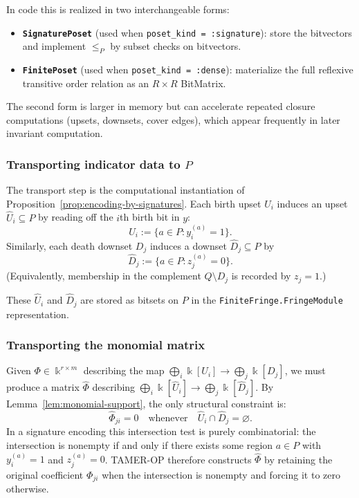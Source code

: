 \documentclass{article}
\newcommand{\kk}{\Bbbk}
\newcommand{\<}{\langle}
\renewcommand{\>}{\rangle}
\theoremstyle{definition}
\theoremstyle{remark}
\begin{document}
	In code this is realized in two interchangeable forms:
	\begin{itemize}
		\item \textbf{\texttt{SignaturePoset}} (used when \texttt{poset\_kind = :signature}):
		store the bitvectors and implement $\le_P$ by subset checks on bitvectors.
		\item \textbf{\texttt{FinitePoset}} (used when \texttt{poset\_kind = :dense}):
		materialize the full reflexive transitive order relation as an $R\times R$ BitMatrix.
	\end{itemize}
	The second form is larger in memory but can accelerate repeated closure computations
	(upsets, downsets, cover edges), which appear frequently in later invariant
	computation.
	
	\subsubsection*{Transporting indicator data to $P$}
	
	The transport step is the computational instantiation of
	Proposition~\ref{prop:encoding-by-signatures}.  Each birth upset $U_i$ induces an
	upset $\widehat{U}_i\subseteq P$ by reading off the $i$th birth bit in $y$:
	\[
	\widehat{U}_i := \{a\in P : y^{(a)}_i = 1\}.
	\]
	Similarly, each death downset $D_j$ induces a downset $\widehat{D}_j\subseteq P$ by
	\[
	\widehat{D}_j := \{a\in P : z^{(a)}_j = 0\}.
	\]
	(Equivalently, membership in the complement $Q\setminus D_j$ is recorded by $z_j=1$.)
	
	These $\widehat{U}_i$ and $\widehat{D}_j$ are stored as bitsets on $P$ in the
	\texttt{FiniteFringe.FringeModule} representation.
	
	\subsubsection*{Transporting the monomial matrix}
	
	Given $\Phi\in \kk^{r\times m}$ describing the map
	$\bigoplus_i \kk[U_i]\to \bigoplus_j \kk[D_j]$, we must produce a matrix
	$\widehat{\Phi}$ describing
	$\bigoplus_i \kk[\widehat{U}_i]\to \bigoplus_j \kk[\widehat{D}_j]$.
	By Lemma~\ref{lem:monomial-support}, the only structural constraint is:
	\[
	\widehat{\Phi}_{ji} = 0 \quad\text{whenever}\quad \widehat{U}_i\cap \widehat{D}_j=\varnothing.
	\]
	In a signature encoding this intersection test is purely combinatorial: the
	intersection is nonempty if and only if there exists some region $a\in P$ with
	$y^{(a)}_i=1$ and $z^{(a)}_j=0$.  TAMER-OP therefore constructs $\widehat{\Phi}$ by
	retaining the original coefficient $\Phi_{ji}$ when the intersection is nonempty
	and forcing it to zero otherwise.
	
\end{document}
